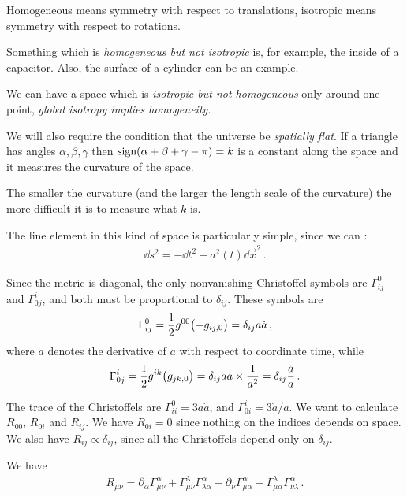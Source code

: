 \documentclass[main.tex]{subfiles}
\begin{document}
Homogeneous means symmetry with respect to translations, isotropic means symmetry with respect to rotations. 

Something which is \emph{homogeneous but not isotropic} is, for example, the inside of a capacitor. Also, the surface of a cylinder can be an example. 

We can have a space which is \emph{isotropic but not homogeneous} only around one point, \emph{global isotropy implies homogeneity}. 

We will also require the condition that the universe be \emph{spatially flat}. 
If a triangle has angles \(\alpha , \beta , \gamma \) then \(\text{sign} ( \alpha + \beta +\gamma -\pi ) = k\) is a constant along the space and it measures the curvature of the space. 

The smaller the curvature (and the larger the length scale of the curvature) the more difficult it is to measure what \(k\) is. 

The line element in this kind of space is particularly simple, since we can : 
%
\begin{align}
  \dd{s^2} = - \dd{t^2} + a^2(t) \dd{\vec{x}^2}
\,.
\end{align}

Since the metric is diagonal, the only nonvanishing Christoffel symbols are \(\Gamma^{0}_{ij}\) and \(\Gamma^{i}_{0j}\), and both must be proportional to \(\delta_{ij}\). 
These symbols are
%
\begin{align}
  \Gamma^{0}_{ij} = \frac{1}{2} g^{00} \qty(-g_{ij,0}) = \delta_{ij} a \dot{a}
\,,
\end{align}
%
where \(\dot{a}\) denotes the derivative of \(a\) with respect to coordinate time, while 
%
\begin{align}
  \Gamma^{i}_{0j} = \frac{1}{2} g^{ik} \qty(g_{jk,0}) = \delta_{ij} a \dot{a} \times \frac{1}{a^2} = \delta_{ij} \frac{\dot{a}}{a}
\,.
\end{align}

The trace of the Christoffels are \(\Gamma^{0}_{ii} = 3a \dot{a}\), and \(\Gamma^{i}_{0i} = 3 \dot{a} / a\). We want to calculate \(R_{00} \), \(R_{0i}\) and \(R_{ij}\). 
We have \(R_{0i} = 0\) since nothing on the indices depends on space. We also have \(R_{ij} \propto \delta_{ij}\), since all the Christoffels depend only on \(\delta_{ij}\). 

We have 
%
\begin{align}
  R_{\mu \nu } = \partial_{\alpha} \Gamma^{\alpha }_{ \mu \nu } + \Gamma^{\lambda }_{\mu \nu } \Gamma^{\alpha }_{\lambda \alpha } - \partial_{\nu }\Gamma^{\alpha }_{\mu \alpha } - \Gamma^{\lambda }_{\mu \alpha } \Gamma^{\alpha }_{\nu \lambda }
\,.
\end{align}
\end{document}
